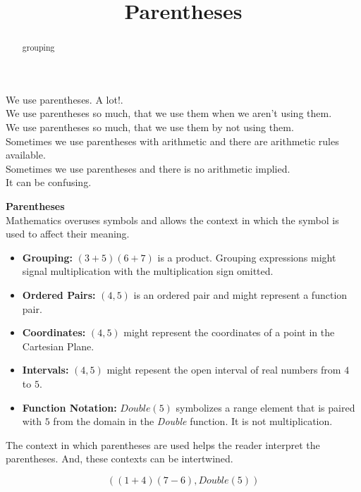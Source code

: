 \documentclass{ximera}
\title{Parentheses}
\begin{document}
\begin{abstract}
grouping
\end{abstract}
\maketitle



We use parentheses. A lot!. \\

We use parentheses so much, that we use them when we aren't using them. \\

We use parentheses so much, that we use them by not using them. \\

Sometimes we use parentheses with arithmetic and there are arithmetic rules available. \\

Sometimes we use parentheses and there is no arithmetic implied. \\


It can be confusing. \\ 









\begin{notation}  \textbf{\textcolor{blue!55!black}{Parentheses}}  \\

Mathematics overuses symbols and allows the context in which the symbol is used to affect their meaning.
  \begin{itemize}
    \item \textbf{Grouping:} $(3+5)(6+7)$ is a product.  Grouping expressions might signal multiplication with the multiplication sign omitted.
    \item \textbf{Ordered Pairs:} $(4, 5)$ is an ordered pair and might represent a function pair.
    \item \textbf{Coordinates:} $(4, 5)$ might represent the coordinates of a point in the Cartesian Plane.
    \item \textbf{Intervals:} $(4, 5)$ might repesent the open interval of real numbers from $4$ to $5$.
    \item \textbf{Function Notation:} $Double(5)$ symbolizes a range element that is paired with $5$ from the domain in the \textit{Double} function. It is not multiplication.
  \end{itemize}


The context in which parentheses are used helps the reader interpret the parentheses.  And, these contexts can be intertwined.

\[  ((1+4)(7-6), Double(5))    \]
\end{notation}
\end{document}
